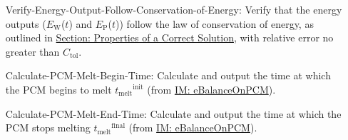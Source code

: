 \documentclass[12pt]{article}
\begin{document}
\begin{itemize}
\item[Verify-Energy-Output-Follow-Conservation-of-Energy:\phantomsection\label{verifyEnergyOutput}]{Verify that the energy outputs (${E_{\text{W}}}$($t$) and ${E_{\text{P}}}$($t$)) follow the law of conservation of energy, as outlined in \hyperref[Sec:CorSolProps]{Section: Properties of a Correct Solution}, with relative error no greater than ${C_{\text{tol}}}$.}
\item[Calculate-PCM-Melt-Begin-Time:\phantomsection\label{calcPCMMeltBegin}]{Calculate and output the time at which the PCM begins to melt ${{t_{\text{melt}}}^{\text{init}}}$ (from \hyperref[IM:eBalanceOnPCM]{IM: eBalanceOnPCM}).}
\item[Calculate-PCM-Melt-End-Time:\phantomsection\label{calcPCMMeltEnd}]{Calculate and output the time at which the PCM stops melting ${{t_{\text{melt}}}^{\text{final}}}$ (from \hyperref[IM:eBalanceOnPCM]{IM: eBalanceOnPCM}).}
\end{itemize}
\end{document}
